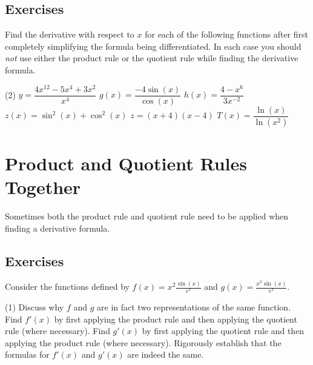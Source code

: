 \documentclass[12pt,]{book}
\theoremstyle{plain}
\theoremstyle{definition}
\numberwithin{equation}{section}
\newcommand{\fe}[2]{#1\mathopen{}\left(#2\right)\mathclose{}}
\newcommand{\fd}[1]{#1'}
\begin{document}
\subsection[Exercises]{Exercises}\label{exercises-39}
\hypertarget{exercisegroup-80}{\null}Find the derivative with respect to \(x\) for each of the following functions after first completely simplifying the formula being differentiated.  In each case you should \emph{not} use either the product rule or the quotient rule while finding the derivative formula.%
\par
\begin{exercisegroup}(2)
\exercise[1.]\hypertarget{exercise-385}{\null}\(y=\dfrac{4x^{12}-5x^4+3x^2}{x^4}\)%
\exercise[2.]\hypertarget{exercise-386}{\null}\(\fe{g}{x}=\dfrac{-4\fe{\sin}{x}}{\fe{\cos}{x}}\)%
\exercise[3.]\hypertarget{exercise-387}{\null}\(\fe{h}{x}=\dfrac{4-x^6}{3x^{-2}}\)%
\exercise[4.]\hypertarget{exercise-388}{\null}\(\fe{z}{x}=\fe{\sin^2}{x}+\fe{\cos^2}{x}\)%
\exercise[5.]\hypertarget{exercise-389}{\null}\(z=(x+4)(x-4)\)%
\exercise[6.]\hypertarget{exercise-390}{\null}\(\fe{T}{x}=\dfrac{\fe{\ln}{x}}{\fe{\ln}{x^2}}\)%
\end{exercisegroup}
\par\smallskip\noindent
\typeout{************************************************}
\typeout{************************************************}
\section[Product, Quotient Rules Together]{Product and Quotient Rules Together}\label{section-product-and-quotient-together}
Sometimes both the product rule and quotient rule need to be applied when finding a derivative formula.%
\typeout{************************************************}
\typeout{************************************************}
\subsection[Exercises]{Exercises}\label{exercises-40}
\hypertarget{exercisegroup-81}{\null}Consider the functions defined by \(\fe{f}{x}=x^2\frac{\fe{\sin}{x}}{e^x}\) and \(\fe{g}{x}=\frac{x^2\fe{\sin}{x}}{e^x}\).%
\par
\begin{exercisegroup}(1)
\exercise[1.]\hypertarget{exercise-391}{\null}Discuss why \(f\) and \(g\) are in fact two representations of the same function.%
\exercise[2.]\hypertarget{exercise-392}{\null}Find \(\fe{\fd{f}}{x}\) by first applying the product rule and then applying the quotient rule (where necessary).%
\exercise[3.]\hypertarget{exercise-393}{\null}Find \(\fe{\fd{g}}{x}\) by first applying the quotient rule and then applying the product rule (where necessary).%
\exercise[4.]\hypertarget{exercise-394}{\null}Rigorously establish that the formulas for \(\fe{\fd{f}}{x}\) and \(\fe{\fd{g}}{x}\) are indeed the same.%
\end{exercisegroup}
\par\smallskip\noindent
\typeout{************************************************}
\typeout{************************************************}
\end{document}
